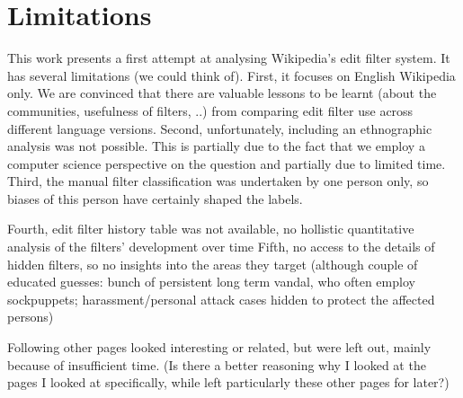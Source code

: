 \begin{comment}
Use as an argument in favor of filter came to be this way organically
\url{http://www.aaronsw.com/weblog/whorunswikipedia}
"But what’s less well-known is that it’s also the site that anyone can run. The vandals aren’t stopped because someone is in charge of stopping them; it was simply something people started doing. And it’s not just vandalism: a “welcoming committee” says hi to every new user, a “cleanup taskforce” goes around doing factchecking. The site’s rules are made by rough consensus. Even the servers are largely run this way — a group of volunteer sysadmins hang out on IRC, keeping an eye on things. Until quite recently, the Foundation that supposedly runs Wikipedia had no actual employees.
This is so unusual, we don’t even have a word for it. It’s tempting to say “democracy”, but that’s woefully inadequate. Wikipedia doesn’t hold a vote and elect someone to be in charge of vandal-fighting. Indeed, “Wikipedia” doesn’t do anything at all. Someone simply sees that there are vandals to be fought and steps up to do the job."
//yeah, I'd call it "do-ocracy"

\end{comment}

\section{Limitations}

This work presents a first attempt at analysing Wikipedia's edit filter system.
It has several limitations (we could think of).
First, it focuses on English Wikipedia only.
We are convinced that there are valuable lessons to be learnt (about the communities, usefulness of filters, ..) from comparing edit filter use across different language versions.
Second, unfortunately, including an ethnographic analysis was not possible.
This is partially due to the fact that we employ a computer science perspective on the question and partially due to limited time.
Third, the manual filter classification was undertaken by one person only, so biases of this person have certainly shaped the labels.

Fourth, edit filter history table was not available, no hollistic quantitative analysis of the filters' development over time
Fifth, no access to the details of hidden filters, so no insights into the areas they target (although couple of educated guesses: bunch of persistent long term vandal, who often employ sockpuppets; harassment/personal attack cases hidden to protect the affected persons)


Following other pages looked interesting or related, but were left out, mainly because of insufficient time.
(Is there a better reasoning why I looked at the pages I looked at specifically, while left particularly these other pages for later?)

